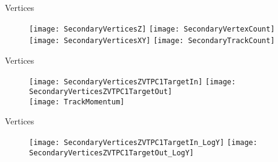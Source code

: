 \documentclass[11pt]{beamer}
\begin{document}


\begin{frame}{Vertices}
\begin{figure}
\centering
\texttt{[image: SecondaryVerticesZ]}
\texttt{[image: SecondaryVertexCount]} \\
\texttt{[image: SecondaryVerticesXY]}
\texttt{[image: SecondaryTrackCount]} \\
\end{figure}
\end{frame}

\begin{frame}{Vertices}
\begin{figure}
\centering
\texttt{[image: SecondaryVerticesZVTPC1TargetIn]}
\texttt{[image: SecondaryVerticesZVTPC1TargetOut]}\\
\texttt{[image: TrackMomentum]}
\end{figure}
\end{frame}

\begin{frame}{Vertices}
  \begin{figure} 
    \centering
    \texttt{[image: SecondaryVerticesZVTPC1TargetIn\_LogY]}  
    \texttt{[image: SecondaryVerticesZVTPC1TargetOut\_LogY]}
  \end{figure}
\end{frame} 
\end{document}
